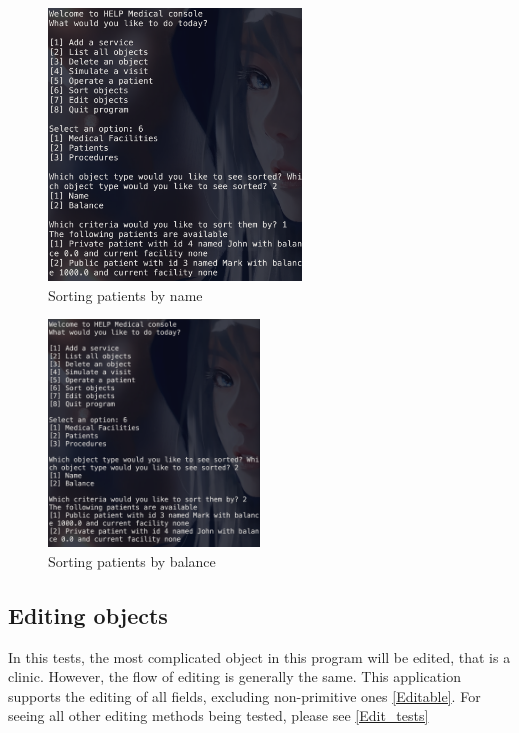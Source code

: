 \documentclass{article}
\begin{document}
	\begin{figure}
		\begin{center}
			\includegraphics[width=0.6\textwidth]{figures/Sorting/Sorting_01.png}
		\end{center}
		\caption{Sorting patients by name}\label{fig:sorting_01}
	\end{figure}

	\begin{figure}
		\begin{center}
			\includegraphics[width=0.5\textwidth]{figures/Sorting/Sorting_02.png}
		\end{center}
		\caption{Sorting patients by balance}\label{fig:sorting_02}
	\end{figure}

	\subsection{Editing objects}\label{sub:editing_objects} %
	In this tests, the most complicated object in this program will be edited, that is a clinic. However, the flow of editing is generally the same. This application supports the editing of all fields, excluding non-primitive ones \ref{Editable}. For seeing all other editing methods being tested, please see \ref{Edit_tests}
\end{document}
